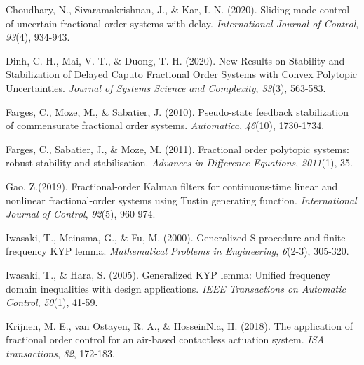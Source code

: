 \documentclass[]{interact}
\theoremstyle{plain}%
\theoremstyle{definition}
\theoremstyle{remark}
\begin{document}
\begin{thebibliography}{}
	Choudhary, N., Sivaramakrishnan, J., \& Kar, I. N. (2020). Sliding mode control of uncertain fractional order systems with delay. \emph{International Journal of Control}, \emph{93}(4), 934-943.

	Dinh, C. H., Mai, V. T., \& Duong, T. H. (2020). New Results on Stability and Stabilization of Delayed Caputo Fractional Order Systems with Convex Polytopic Uncertainties. \emph{Journal of Systems Science and Complexity}, \emph{33}(3), 563-583.
 

	Farges, C., Moze, M., \& Sabatier, J. (2010). Pseudo-state feedback stabilization of commensurate fractional order systems. \emph{Automatica}, \emph{46}(10), 1730-1734.
	
	Farges, C., Sabatier, J., \& Moze, M. (2011). Fractional order polytopic systems: robust stability and stabilisation. \emph{Advances in Difference Equations}, \emph{2011}(1), 35. 
	
	
	
    Gao, Z.(2019). Fractional-order Kalman filters for continuous-time linear and nonlinear fractional-order systems using Tustin generating function. \emph{International Journal of Control}, \emph{92}(5), 960-974.

	Iwasaki, T., Meinsma, G., \& Fu, M. (2000). Generalized S-procedure and finite frequency KYP lemma. \emph{Mathematical Problems in Engineering}, \emph{6}(2-3), 305-320.
	
	Iwasaki, T., \& Hara, S. (2005). Generalized KYP lemma: Unified frequency domain inequalities with design applications. \emph{IEEE Transactions on Automatic Control}, \emph{50}(1), 41-59.
	
	Krijnen, M. E., van Ostayen, R. A., \& HosseinNia, H. (2018). The application of fractional order control for an air-based contactless actuation system. \emph{ISA transactions}, \emph{82}, 172-183.
	

\end{thebibliography}
\end{document}

